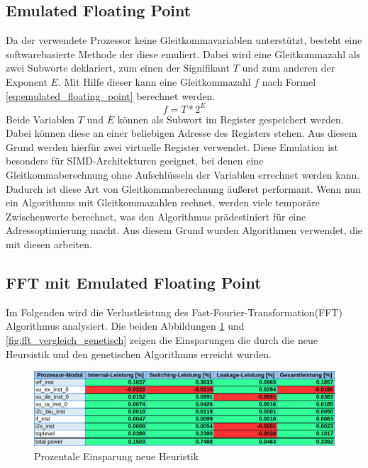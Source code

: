 \subsection{Emulated Floating Point}
\label{chap:emulated_floating_point}
Da der verwendete Prozessor keine Gleitkommavariablen unterstützt, besteht eine softwarebasierte Methode der diese emuliert. Dabei wird eine Gleitkommazahl als zwei Subworte deklariert, zum einen der Signifikant $T$ und zum anderen der Exponent $E$. Mit Hilfe dieser kann eine Gleitkommazahl $f$ nach Formel \ref{eq:emulated_floating_point} berechnet werden.
\begin{equation}
f = T *2^E
\label{eq:emulated_floating_point}
\end{equation}
Beide Variablen $T$ und $E$ können als Subwort im Register gespeichert werden. Dabei können diese an einer beliebigen Adresse des Registers stehen. Aus diesem Grund werden hierfür zwei virtuelle Register verwendet. Diese Emulation ist besonders für SIMD-Architekturen geeignet, bei denen eine Gleitkommaberechnung ohne Aufschlüsseln der Variablen errechnet werden kann. Dadurch ist diese Art von Gleitkommaberechnung äußerst performant.
Wenn nun ein Algorithmus mit Gleitkommazahlen rechnet, werden viele temporäre Zwischenwerte berechnet, was den Algorithmus prädestiniert für eine Adressoptimierung macht. Aus diesem Grund wurden  Algorithmen verwendet, die mit diesen arbeiten. \cite{gerlach2016efficient}

\subsection{FFT mit Emulated Floating Point}
Im Folgenden wird die Verlustleistung des \glqq Fast-Fourier-Transformation\grqq{ }(FFT) Algorithmus analysiert. Die beiden Abbildungen \ref{fig:fft_vergleich_heuristik} und \ref{fig:fft_vergleich_genetisch} zeigen die Einsparungen die durch die neue Heursistik und den genetischen Algorithmus erreicht wurden.

\begin{figure}[H]
	\centering
	\includegraphics[width=\textwidth]{fig/fft_vergleich_heuristik.pdf}
	\caption{Prozentale Einsparung neue Heuristik}
	\label{fig:fft_vergleich_heuristik}
\end{figure}
	
